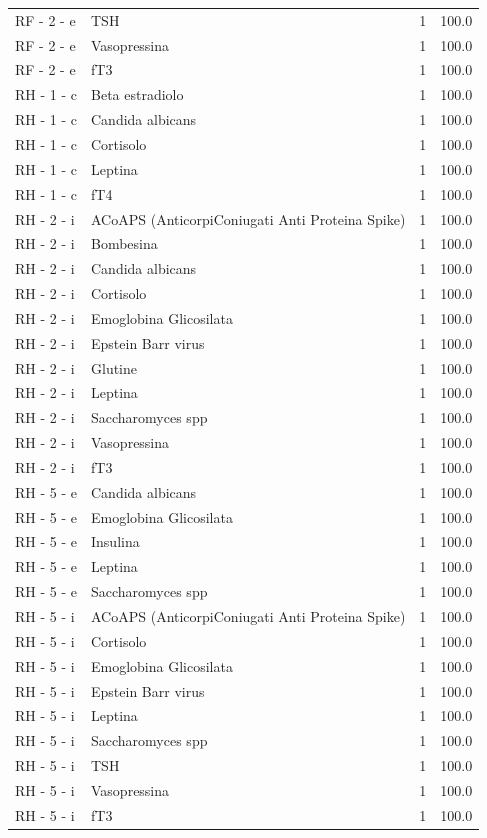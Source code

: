 \documentclass[a4paper,11pt]{article}
\begin{document}
\begin{footnotesize}
\begin{longtable}{p{3.5cm}p{7.5cm}rr}
RF - 2 - e & TSH & 1 & 100.0 \\
RF - 2 - e & Vasopressina & 1 & 100.0 \\
RF - 2 - e & fT3 & 1 & 100.0 \\
RH - 1 - c & Beta estradiolo & 1 & 100.0 \\
RH - 1 - c & Candida albicans & 1 & 100.0 \\
RH - 1 - c & Cortisolo & 1 & 100.0 \\
RH - 1 - c & Leptina & 1 & 100.0 \\
RH - 1 - c & fT4 & 1 & 100.0 \\
RH - 2 - i & ACoAPS (AnticorpiConiugati Anti Proteina Spike) & 1 & 100.0 \\
RH - 2 - i & Bombesina & 1 & 100.0 \\
RH - 2 - i & Candida albicans & 1 & 100.0 \\
RH - 2 - i & Cortisolo & 1 & 100.0 \\
RH - 2 - i & Emoglobina Glicosilata & 1 & 100.0 \\
RH - 2 - i & Epstein Barr virus & 1 & 100.0 \\
RH - 2 - i & Glutine & 1 & 100.0 \\
RH - 2 - i & Leptina & 1 & 100.0 \\
RH - 2 - i & Saccharomyces spp & 1 & 100.0 \\
RH - 2 - i & Vasopressina & 1 & 100.0 \\
RH - 2 - i & fT3 & 1 & 100.0 \\
RH - 5 - e & Candida albicans & 1 & 100.0 \\
RH - 5 - e & Emoglobina Glicosilata & 1 & 100.0 \\
RH - 5 - e & Insulina & 1 & 100.0 \\
RH - 5 - e & Leptina & 1 & 100.0 \\
RH - 5 - e & Saccharomyces spp & 1 & 100.0 \\
RH - 5 - i & ACoAPS (AnticorpiConiugati Anti Proteina Spike) & 1 & 100.0 \\
RH - 5 - i & Cortisolo & 1 & 100.0 \\
RH - 5 - i & Emoglobina Glicosilata & 1 & 100.0 \\
RH - 5 - i & Epstein Barr virus & 1 & 100.0 \\
RH - 5 - i & Leptina & 1 & 100.0 \\
RH - 5 - i & Saccharomyces spp & 1 & 100.0 \\
RH - 5 - i & TSH & 1 & 100.0 \\
RH - 5 - i & Vasopressina & 1 & 100.0 \\
RH - 5 - i & fT3 & 1 & 100.0 \\
\end{longtable}
\end{footnotesize}
\end{document}
